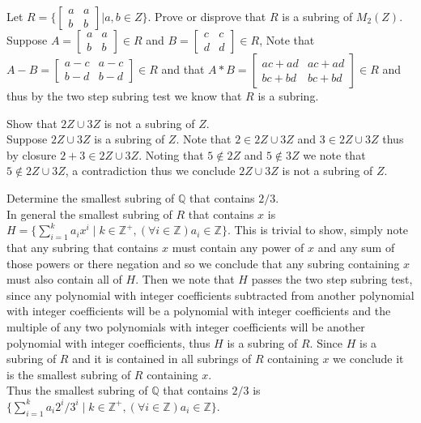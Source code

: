 \documentclass[12pt]{article}
\makeatletter
\theoremstyle{homework}
\newenvironment{exercise}[1]
{\def\@currentlabel{#1}\exercisecore}
{\endexercisecore}
\makeatother
\begin{document}
\begin{exercise}{12.42}
Let $R =\biggr\{\begin{bmatrix} a&a\\ b&b \end{bmatrix} \biggr| a,b\in Z \biggr\} $. Prove or disprove that $R$ is a subring of $M_2(Z)$.\\
Suppose $A=\begin{bmatrix} a&a\\ b&b \end{bmatrix}\in R$ and $B=\begin{bmatrix} c&c\\ d&d \end{bmatrix}\in R$,  Note that $A-B=\begin{bmatrix} a-c&a-c\\ b-d&b-d \end{bmatrix}\in R$ and that $A*B=\begin{bmatrix} ac+ad&ac+ad\\ bc+bd&bc+bd \end{bmatrix}\in R$ and thus by the two step subring test we know that $R$ is a subring.
\end{exercise}

\begin{exercise}{12.46}
Show that $2Z \cup 3Z$ is not a subring of $Z$.\\
Suppose $2Z \cup 3Z$ is a subring of $Z$.  Note that $2\in 2Z \cup 3Z$ and $3\in 2Z \cup 3Z$ thus by closure $2+3\in 2Z \cup 3Z$.  Noting that $5\not\in 2Z$ and $5\not\in 3Z$ we note that $5\not\in 2Z\cup 3Z$, a contradiction thus we conclude $2Z \cup 3Z$ is not a subring of $Z$.
\end{exercise}

\begin{exercise}{12.48}
Determine the smallest subring of $\mathbb{Q}$ that contains $2/3$.\\
In general the smallest subring of $R$ that contains $x$ is $H=\{\sum_{i=1}^k a_i x^i\mid k\in \mathbb{Z}^+,(\forall i\in \mathbb{Z}) a_i\in \mathbb{Z}\}$.  This is trivial to show, simply note that any subring that contains $x$ must contain any power of $x$ and any sum of those powers or there negation and so we conclude that any subring containing $x$ must also contain all of $H$.  Then we note that $H$ passes the two step subring test, since any polynomial with integer coefficients subtracted from another polynomial with integer coefficients will be a polynomial with integer coefficients and the multiple of any two polynomials with integer coefficients will be another polynomial with integer coefficients, thus $H$ is a subring of $R$.  Since $H$ is a subring of $R$ and it is contained in all subrings of $R$ containing $x$ we conclude it is the smallest subring of $R$ containing $x$.\\
Thus the smallest subring of $\mathbb{Q}$ that contains $2/3$ is $\{\sum_{i=1}^k a_i 2^i/3^i\mid k\in \mathbb{Z}^+,(\forall i\in \mathbb{Z}) a_i\in \mathbb{Z}\}$.
\end{exercise}
\end{document}
